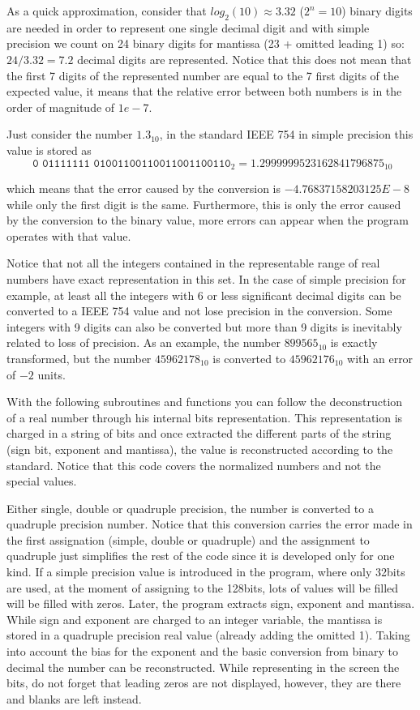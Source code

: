 As a quick approximation, consider that $log_2(10)\approx 3.32 $ ($2^n = 10$) binary digits are needed in order to represent one single decimal digit and with simple precision we count on 24 binary digits for mantissa (23 + omitted leading 1) so: $24/3.32 = 7.2$ decimal digits are represented. Notice that this does not mean that the first 7 digits of the represented number are equal to the 7 first digits of the expected value, it means that the relative error between both numbers is in the order of magnitude of $1e-7$. 

Just consider the number $1.3_{10}$, in the standard IEEE 754 in simple precision this value is stored as $$\texttt{ 0 01111111 01001100110011001100110}_2 = 1.2999999523162841796875_{10} $$

which means that the error caused by the conversion is $-4.76837158203125E-8$ while only the first digit is the same. Furthermore, this is only the error caused by the conversion to the binary value, more errors can appear when the program operates with that value. 

\begin{IN}
    Notice that not all the integers contained in the representable range of real numbers have exact representation in this set. In the case of simple precision for example, at least all the integers with 6 or less significant decimal digits can be converted to a IEEE 754 value and not lose precision in the conversion. Some integers with 9 digits can also be converted but more than 9 digits is inevitably related to loss of precision. As an example, the number $899565_{10}$ is exactly transformed, but the number $45962178_{10}$ is converted to $ 45962176_{10}$ with an error of $-2$ units. 
\end{IN}

With the following subroutines and functions you can follow the deconstruction of a real number through his internal bits representation. This representation is charged in a string of bits and once extracted the different parts of the string (sign bit, exponent and mantissa), the value is reconstructed according to the standard. Notice that this code covers the normalized numbers and not the special values.

Either single, double or quadruple precision, the number is converted to a quadruple precision number. Notice that this conversion carries the error made in the first assignation (simple, double or quadruple) and the assignment to quadruple just simplifies the rest of the code since it is developed only for one kind. If a simple precision value is introduced in the program, where only 32bits are used, at the moment of assigning to the 128bits, lots of values will be filled will be filled with zeros. Later, the program extracts sign, exponent and mantissa. While sign and exponent are charged to an integer variable, the mantissa is stored in a quadruple precision real value (already adding the omitted 1). Taking into account the bias for the exponent and the basic conversion from binary to decimal the number can be reconstructed. While representing in the screen the bits, do not forget that leading zeros are not displayed, however, they are there and blanks are left instead.

